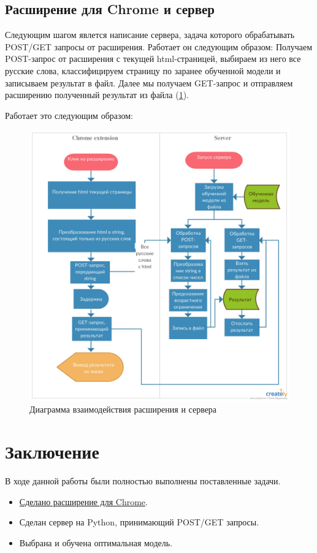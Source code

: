 \documentclass[14pt]{matmex-diploma}
\begin{document}
    
    \subsection{Расширение для Chrome и сервер}
    
        Следующим шагом явлется написание сервера, задача которого обрабатывать POST/GET запросы от расширения. Работает он следующим образом:
        Получаем POST-запрос от расширения с текущей html-страницей, выбираем из него все русские слова, классифицируем страницу по заранее обученной
        модели и записываем результат в файл. Далее мы получаем GET-запрос и отправляем расширению полученный результат из файла (\ref{uml}).
    
        Работает это следующим образом:
        \begin{figure}[h]
            \centering
        	\includegraphics[scale=0.22]{images/uml.png}
        	\caption{Диаграмма взаимодействия расширения и сервера}
        	\label{uml}
        \end{figure}     
        
\section*{Заключение}        
    В ходе данной работы были полностью выполнены поставленные задачи.
        \begin{itemize}
            \item \href{https://github.com/SmirnovAlexander/PoemClassifier}{Сделано расширение для Chrome}.
            \item Сделан сервер на Python, принимающий POST/GET запросы.
            \item Выбрана и обучена оптимальная модель.
        \end{itemize}


\setmonofont[Mapping=tex-text]{CMU Typewriter Text}


\end{document}
